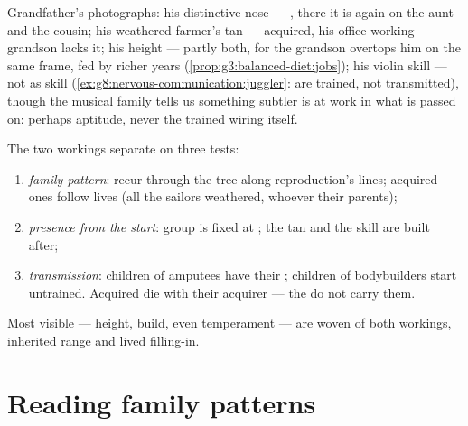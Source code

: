 \begin{example}\label{ex:g9:heredity-and-traits:album}
Grandfather's photographs: his distinctive nose ---
, there it is again on the aunt and the cousin;
his weathered farmer's tan --- acquired, his
office-working grandson lacks it; his height --- partly
both, for the grandson overtops him on the same frame,
fed by richer years (\cref{prop:g3:balanced-diet:jobs});
his violin skill --- not  as skill
(\cref{ex:g8:nervous-communication:juggler}:  are
trained, not transmitted), though the musical family
tells us something subtler is at work in what is passed
on: perhaps aptitude, never the trained wiring itself.
\end{example}

\begin{proposition}\label{prop:g9:heredity-and-traits:sorting}
The two workings separate on three tests:
\begin{enumerate}
  \item \emph{family pattern}:  recur
        through the tree along reproduction's lines;
        acquired ones follow lives (all the sailors
        weathered, whoever their parents);
  \item \emph{presence from the start}:  group is
        fixed at ; the tan and the skill are
        built after;
  \item \emph{transmission}: children of amputees have
        their ; children of bodybuilders start
        untrained. Acquired  die with their
        acquirer --- the  do not carry them.
\end{enumerate}
Most visible  --- height, build, even temperament
--- are woven of both workings, inherited range and lived
filling-in.
\end{proposition}
\admitted

\section{Reading family patterns}

